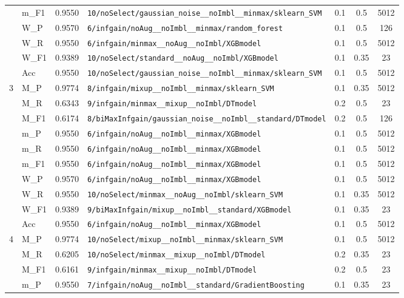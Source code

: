 \begin{table}[htbp]
\begin{tabular}{|c|l|c|>{\ttfamily\footnotesize}p{7.2cm}|c|c|c|}
 & m\_F1 & 0.9550 & \texttt{10/noSelect/gaussian\_noise\_\_noImbl\_\_minmax/sklearn\_SVM} & 0.1 & 0.5  & 5012 \\ 
 & W\_P & 0.9570 & \texttt{6/infgain/noAug\_\_noImbl\_\_minmax/random\_forest} & 0.1 & 0.5  & 126 \\ 
 & W\_R & 0.9550 & \texttt{6/infgain/minmax\_\_noAug\_\_noImbl/XGBmodel} & 0.1 & 0.5  & 5012 \\ 
 & W\_F1 & 0.9389 & \texttt{10/noSelect/standard\_\_noAug\_\_noImbl/XGBmodel} & 0.1 & 0.35  & 23 \\ 
 & Acc & 0.9550 & \texttt{10/noSelect/gaussian\_noise\_\_noImbl\_\_minmax/sklearn\_SVM} & 0.1 & 0.5  & 5012 \\ 
\hline
\multirow{10}{*}{3} & M\_P & 0.9774 & \texttt{8/infgain/mixup\_\_noImbl\_\_minmax/sklearn\_SVM} & 0.1 & 0.35  & 5012 \\ 
 & M\_R & 0.6343 & \texttt{9/infgain/minmax\_\_mixup\_\_noImbl/DTmodel} & 0.2 & 0.5  & 23 \\ 
 & M\_F1 & 0.6174 & \texttt{8/biMaxInfgain/gaussian\_noise\_\_noImbl\_\_standard/DTmodel} & 0.2 & 0.5  & 126 \\ 
 & m\_P & 0.9550 & \texttt{6/infgain/noAug\_\_noImbl\_\_minmax/XGBmodel} & 0.1 & 0.5  & 5012 \\ 
 & m\_R & 0.9550 & \texttt{6/infgain/noAug\_\_noImbl\_\_minmax/XGBmodel} & 0.1 & 0.5  & 5012 \\ 
 & m\_F1 & 0.9550 & \texttt{6/infgain/noAug\_\_noImbl\_\_minmax/XGBmodel} & 0.1 & 0.5  & 5012 \\ 
 & W\_P & 0.9570 & \texttt{6/infgain/noAug\_\_noImbl\_\_minmax/XGBmodel} & 0.1 & 0.5  & 5012 \\ 
 & W\_R & 0.9550 & \texttt{10/noSelect/minmax\_\_noAug\_\_noImbl/sklearn\_SVM} & 0.1 & 0.35  & 5012 \\ 
 & W\_F1 & 0.9389 & \texttt{9/biMaxInfgain/mixup\_\_noImbl\_\_standard/XGBmodel} & 0.1 & 0.35  & 23 \\ 
 & Acc & 0.9550 & \texttt{6/infgain/noAug\_\_noImbl\_\_minmax/XGBmodel} & 0.1 & 0.5  & 5012 \\ 
\hline
\multirow{10}{*}{4} & M\_P & 0.9774 & \texttt{10/noSelect/mixup\_\_noImbl\_\_minmax/sklearn\_SVM} & 0.1 & 0.5  & 5012 \\ 
 & M\_R & 0.6205 & \texttt{10/noSelect/minmax\_\_mixup\_\_noImbl/DTmodel} & 0.2 & 0.35  & 23 \\ 
 & M\_F1 & 0.6161 & \texttt{9/infgain/minmax\_\_mixup\_\_noImbl/DTmodel} & 0.2 & 0.5  & 23 \\ 
 & m\_P & 0.9550 & \texttt{7/infgain/noAug\_\_noImbl\_\_standard/GradientBoosting} & 0.1 & 0.35  & 23 \\ 

\end{tabular}
\end{table}
